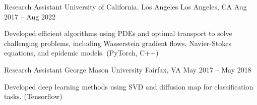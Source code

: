 

\begin{cventries}

  \cventry
    {Research Assistant} %
    {University of California, Los Angeles} %
    {Los Angeles, CA} %
    {Aug 2017 – Aug 2022} %
    {
      \begin{cvitems} %
        \item Developed efficient algorithms using PDEs and optimal transport to solve challenging problems, including Wasserstein gradient flows, Navier-Stokes equations, and epidemic models. {\footnotesize (PyTorch, C++)}
      \end{cvitems}
    }

  \cventry
    {Research Assistant} %
    {George Mason University} %
    {Fairfax, VA} %
    {May 2017 – May 2018} %
    {
      \begin{cvitems} %
        \item Developed deep learning methods using SVD and diffusion map for classification tasks. {\footnotesize (Tensorflow)}
      \end{cvitems}
    }


\end{cventries}

